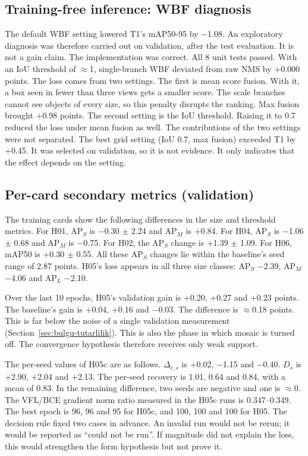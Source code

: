 \subsection{Training-free inference: WBF diagnosis}\label{sec:basarisiz-wbf}
The default WBF setting lowered T1's mAP50-95 by $-$1.08. An exploratory diagnosis was therefore carried out on validation, after the test evaluation. It is not a gain claim. The implementation was correct. All 8 unit tests passed. With an IoU threshold of $\approx$1, single-branch WBF deviated from raw NMS by $+0.000$ points. The loss comes from two settings. The first is mean score fusion. With it, a box seen in fewer than three views gets a smaller score. The scale branches cannot see objects of every size, so this penalty disrupts the ranking. Max fusion brought +0.98 points. The second setting is the IoU threshold. Raising it to 0.7 reduced the loss under mean fusion as well. The contributions of the two settings were not separated. The best grid setting (IoU 0.7, max fusion) exceeded T1 by +0.45. It was selected on validation, so it is not evidence. It only indicates that the effect depends on the setting.

\subsection{Per-card secondary metrics (validation)}
The training cards show the following differences in the size and threshold metrics. For H01, AP$_S$ is $-$0.30 $\pm$ 2.24 and AP$_M$ is +0.84. For H04, AP$_S$ is $-$1.06 $\pm$ 0.68 and AP$_M$ is $-$0.75. For H02, the AP$_S$ change is +1.39 $\pm$ 1.09. For H06, mAP50 is +0.30 $\pm$ 0.55. All these AP$_S$ changes lie within the baseline's seed range of 2.87 points. H05's loss appears in all three size classes: AP$_S$ $-$2.39, AP$_M$ $-$4.06 and AP$_L$ $-$2.10.

Over the last 10 epochs, H05's validation gain is +0.20, +0.27 and +0.23 points. The baseline's gain is +0.04, +0.16 and $-$0.03. The difference is $\approx$0.18 points. This is far below the noise of a single validation measurement (Section~\ref{sec:bulgu-tutarlilik}). This is also the phase in which mosaic is turned off. The convergence hypothesis therefore receives only weak support.

The per-seed values of H05c are as follows. $\Delta_{\mathrm{c},s}$ is +0.02, $-$1.15 and $-$0.40. $D_s$ is +2.90, +2.04 and +2.13. The per-seed recovery is 1.01, 0.64 and 0.84, with a mean of 0.83. In the remaining difference, two seeds are negative and one is $\approx$0. The VFL/BCE gradient norm ratio measured in the H05c runs is 0.347--0.349. The best epoch is 96, 96 and 95 for H05c, and 100, 100 and 100 for H05. The decision rule fixed two cases in advance. An invalid run would not be rerun; it would be reported as ``could not be run''. If magnitude did not explain the loss, this would strengthen the form hypothesis but not prove it.

